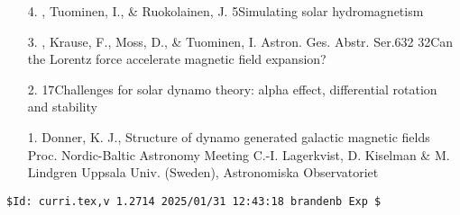 \begin{itemize}
\item[4.]
\Brandenburg, Tuominen, I., \& Ruokolainen, J.
{5}{Simulating solar hydromagnetism}

\item[3.]
\Brandenburg, Krause, F., Moss, D., \& Tuominen, I.
{Astron. Ges. Abstr. Ser.}{6}{32}
{32}{Can the Lorentz force accelerate magnetic field expansion?}

\item[2.]
\Brandenburg{}
{17}{Challenges for solar dynamo theory:
alpha effect, differential rotation and stability}

\item[1.]
Donner, K. J., \Brandenburg{}
{Structure of dynamo generated galactic magnetic fields}
{Proc. Nordic-Baltic Astronomy Meeting}
{C.-I. Lagerkvist, D. Kiselman \& M. Lindgren}
{Uppsala Univ. (Sweden), Astronomiska Observatoriet}
 


\end{itemize}
\verb|$Id: curri.tex,v 1.2714 2025/01/31 12:43:18 brandenb Exp $|
